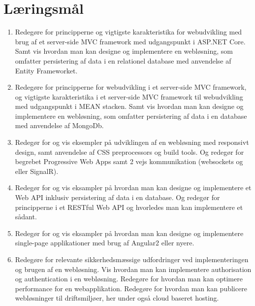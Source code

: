 \section*{Læringsmål}

\begin{enumerate}
	
	\item 
	Redegøre for principperne og vigtigste karakteristika for webudvikling med brug af et server-side MVC framework med udgangspunkt i ASP.NET Core. Samt vis hvordan man kan designe og implementere en	webløsning, som omfatter persistering af data i en relationel database med anvendelse af Entity Frameworket.
	
	\item 
	Redegøre for principperne for webudvikling i et server-side MVC framework, og vigtigste karakteristika i et server-side	MVC framework til webudvikling med udgangspunkt i MEAN stacken. Samt vis hvordan man kan designe og implementere en	webløsning, som omfatter persistering af data i en database	med anvendelse af MongoDb.
	
	\item 
	Redegør for og vis eksempler på udviklingen af en webløsning med responsivt design, samt anvendelse af CSS preprocessors og build tools. Og redegør for begrebet Progressive Web Apps samt 2 vejs	kommunikation (websockets og eller SignalR).
	
	\item 
	Redegør for og vis eksampler på hvordan man kan designe	og implementere et Web API inklusiv persistering af data i en database. Og redegør for principperne i et RESTful Web API og	hvorledes man kan implementere et sådant.
		
	\item
	Redegør for og vis eksampler på hvordan man kan designe	og implementere single-page applikationer med brug af	Angular2 eller nyere.
	
	\item 
	Redegøre for relevante sikkerhedsmæssige udfordringer ved implementeringen og brugen af en webløsning. Vis hvordan man kan implementere authorisation og authentication i en webløsning.	Redegøre for hvordan man kan optimere performance for en webapplikation. Redegøre for hvordan man kan publicere webløsninger til driftsmiljøer, her under også cloud baseret hosting.
	
\end{enumerate}